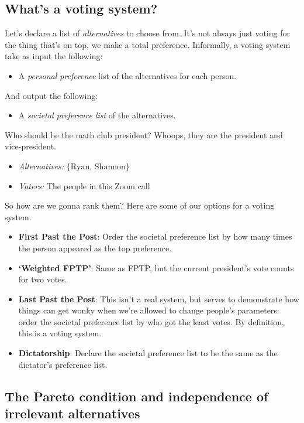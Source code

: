 \subsection{What's a voting system?}
Let's declare a list of \emph{alternatives} to choose from. It's not always just voting for the thing that's on top, we make a total preference. Informally, a voting system take as input the following:
\begin{itemize}
    \item A \emph{personal preference} list of the alternatives for each person.
\end{itemize}
And output the following:
\begin{itemize}
    \item A \emph{societal preference list} of the alternatives.
\end{itemize}
\begin{example}
    Who should be the math club president? Whoops, they are the president and vice-president.
    \begin{itemize}
        \item \emph{Alternatives:} $\{\text{Ryan, Shannon}\} $
        \item \emph{Voters:} The people in this Zoom call 
    \end{itemize}
    So how are we gonna rank them? Here are some of our options for a voting system.
    \begin{itemize}
        \item \textbf{First Past the Post}: Order the societal preference list by how many times the person appeared as the top preference.
        \item \textbf{`Weighted FPTP'}: Same as FPTP, but the current president's vote counts for two votes.
        \item \textbf{Last Past the Post}: This isn't a real system, but serves to demonstrate how things can get wonky when we're allowed to change people's parameters: order the societal preference list by who got the least votes. By definition, this is a voting system.
        \item \textbf{Dictatorship}: Declare the societal preference list to be the same as the dictator's preference list.
    \end{itemize}

    \subsection{The Pareto condition and independence of irrelevant alternatives}
\end{example}
